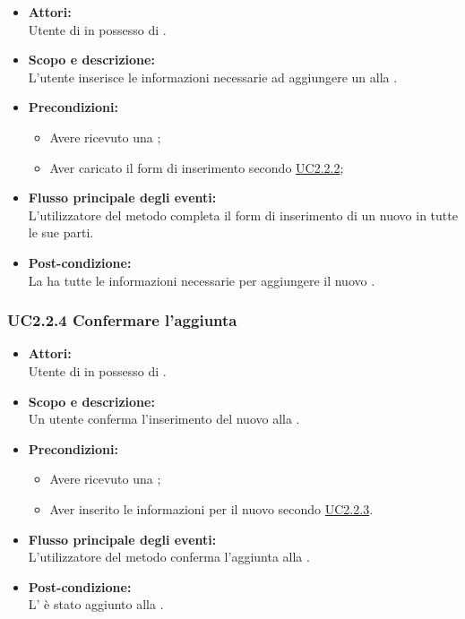 \begin{itemize}
	\item \textbf{Attori:}
	\\Utente di  in possesso di \ProjectName{}.
	\item \textbf{Scopo e descrizione:} 
	\\L'utente inserisce le informazioni necessarie ad aggiungere un  alla .
	\item \textbf{Precondizioni:}
	\begin{itemize}
		\item Avere ricevuto una  ;
		\item Aver caricato il form di inserimento secondo \hyperref[UC2.2.2]{UC2.2.2};
	\end{itemize}
	\item \textbf{Flusso principale degli eventi:}
	\\L'utilizzatore del metodo completa il form di inserimento di un nuovo  in tutte le sue parti.
	\item \textbf{Post-condizione:}
	\\La {} ha tutte le informazioni necessarie per aggiungere il nuovo .
\end{itemize}

\subsubsection{UC2.2.4 Confermare l'aggiunta} \label{UC2.2.4}

\begin{itemize}
	\item \textbf{Attori:}
	\\Utente di  in possesso di \ProjectName{}.
	\item \textbf{Scopo e descrizione:} 
	\\Un utente conferma l'inserimento del nuovo  alla .
	\item \textbf{Precondizioni:}
	\begin{itemize}
		\item Avere ricevuto una  ;
		\item Aver inserito le informazioni per il nuovo  secondo \hyperref[UC2.2.3]{UC2.2.3}.
	\end{itemize}
	\item \textbf{Flusso principale degli eventi:}
	\\L'utilizzatore del metodo conferma l'aggiunta alla .
	\item \textbf{Post-condizione:}
	\\L' è stato aggiunto alla .
\end{itemize}

